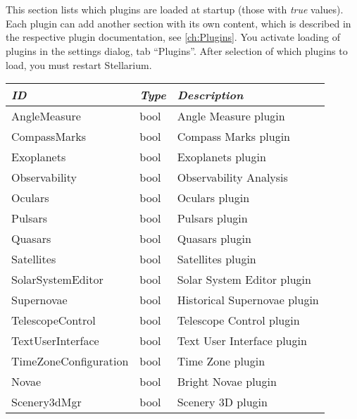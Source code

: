 \section{}
\label{sec:Reference:section-plugins-load-at-startup}

This section lists which plugins are loaded at startup (those with
\emph{true} values). Each plugin can add another section with its own
content, which is described in the respective plugin documentation,
see \ref{ch:Plugins}. You activate loading of plugins in the 
settings dialog, tab ``Plugins''. After selection of which plugins to
load, you must restart Stellarium.

\begin{longtabu} to \textwidth {l|l|X}
\toprule
\emph{ID} & \emph{Type} & \emph{Description}\\
\midrule
AngleMeasure & bool & Angle Measure plugin\\
\midrule
CompassMarks & bool & Compass Marks plugin\\
\midrule
Exoplanets & bool & Exoplanets plugin \\
\midrule
Observability & bool & Observability Analysis\\
\midrule
Oculars & bool & Oculars plugin \\
\midrule
Pulsars & bool & Pulsars plugin \\
\midrule
Quasars & bool & Quasars plugin \\
\midrule
Satellites & bool & Satellites plugin \\
\midrule
SolarSystemEditor & bool & Solar System Editor plugin\\
\midrule
Supernovae & bool & Historical Supernovae plugin \\
\midrule
TelescopeControl & bool & Telescope Control plugin \\
\midrule
TextUserInterface & bool & Text User Interface plugin \\
\midrule
TimeZoneConfiguration & bool & Time Zone plugin \\
\midrule
Novae & bool & Bright Novae plugin \\
\midrule
Scenery3dMgr & bool & Scenery 3D plugin \\
\bottomrule
\end{longtabu}

\section{}\label{section-projection}

